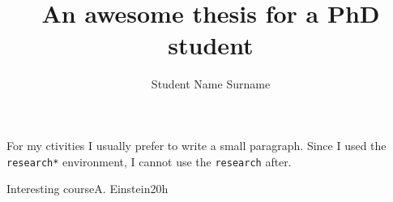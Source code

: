 \documentclass[bib]{unitn-bimrep}
\author{Student Name Surname}
\title{An awesome thesis for a PhD student}
\begin{document}
\begin{research*}
  For my ctivities I usually prefer to write a small paragraph. Since I used the
  \texttt{research*} environment, I cannot use the \texttt{research} after.
\end{research*}

\begin{school}
  \item{Interesting course}{A. Einstein}{20h}
\end{school}

\begin{production*}
  \nocite{ref:1,ref:2} %
  \printbibliography  %
\end{production*}
\end{document}
